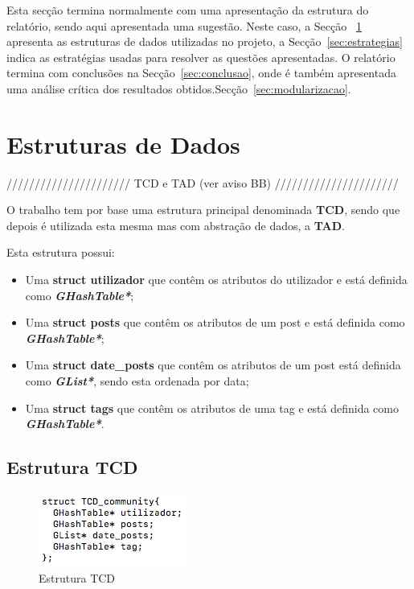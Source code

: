 \documentclass[a4paper]{article}
\begin{document}
Esta secção termina normalmente com uma apresentação da estrutura do
relatório, sendo aqui apresentada uma sugestão. Neste caso, a Secção
~\ref{sec:estruturas} apresenta as estruturas de dados utilizadas 
no projeto, a Secção~\ref{sec:estrategias} indica as estratégias usadas 
para resolver as  questões apresentadas. O relatório termina com conclusões na
Secção~\ref{sec:conclusao}, onde é também apresentada uma análise
crítica dos resultados obtidos.Secção~\ref{sec:modularizacao}.

\section{Estruturas de Dados}
\label{sec:estruturas}

////////////////////// TCD e TAD (ver aviso BB) //////////////////////

O trabalho tem por base uma estrutura principal denominada \textbf{TCD}, 
sendo que depois é utilizada esta mesma mas com abstração de dados, a 
\textbf{TAD}.

Esta estrutura possui:
\begin{itemize}
\item Uma \textbf{struct utilizador} que contêm os atributos do utilizador
e está definida como \textit{\textbf{GHashTable*}};
\item Uma \textbf{struct posts} que contêm os atributos de um post e
está definida como \textit{\textbf{GHashTable*}};
\item Uma \textbf{struct date\_posts} que contêm os atributos de um post
está definida como \textit{\textbf{GList*}}, sendo esta ordenada por data;
\item Uma \textbf{struct tags} que contêm os atributos de uma tag e
está definida como \textit{\textbf{GHashTable*}}.
\end{itemize}


\subsection{Estrutura TCD}
\begin{figure}[ht]
\centering
\includegraphics[scale=0.50]{image_tcd}
\caption{Estrutura TCD} 
\label{img:tcd}
\end{figure}
\end{document}
